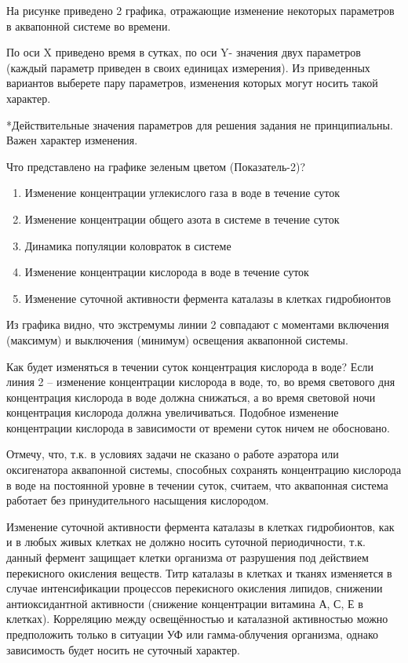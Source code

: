 
На рисунке приведено 2 графика, отражающие изменение некоторых параметров в аквапонной системе во времени.

По оси X приведено время в сутках, по оси Y- значения двух параметров (каждый параметр приведен в своих единицах измерения). Из приведенных вариантов выберете пару параметров, изменения которых могут носить такой характер.


*Действительные значения параметров для решения задания не принципиальны. Важен характер изменения.

Что представлено на графике зеленым цветом (Показатель-2)?

\begin{enumerate}
    \item Изменение концентрации углекислого газа в воде в течение суток
    \item Изменение концентрации общего азота в системе в течение суток
    \item Динамика популяции коловраток в системе
    \item Изменение концентрации кислорода в воде в течение суток
    \item Изменение суточной активности фермента каталазы в клетках гидробионтов
\end{enumerate}

\explanationSection

Из графика видно, что экстремумы линии 2 совпадают с моментами включения (максимум) и выключения (минимум) освещения аквапонной системы. 

Как будет изменяться в течении суток концентрация кислорода в воде? Если линия 2 – изменение концентрации кислорода в воде, то, во время светового дня концентрация кислорода в воде должна снижаться, а во время световой ночи концентрация кислорода должна увеличиваться. Подобное изменение концентрации кислорода в зависимости от времени суток ничем не обосновано.

Отмечу, что, т.к. в условиях задачи не сказано о работе аэратора или оксигенатора аквапонной системы, способных сохранять концентрацию кислорода в воде на постоянной уровне в течении суток, считаем, что аквапонная система работает без принудительного насыщения кислородом.

Изменение суточной активности фермента каталазы в клетках гидробионтов, как и в любых живых клетках не должно носить суточной периодичности, т.к. данный фермент защищает клетки организма от разрушения под действием перекисного окисления веществ. Титр каталазы в клетках и тканях изменяется в случае интенсификации процессов перекисного окисления липидов, снижении антиоксидантной активности (снижение концентрации витамина А, С, Е в клетках). Корреляцию между освещённостью и каталазной активностью можно предположить только в ситуации УФ или гамма-облучения организма, однако зависимость будет носить не суточный характер.

